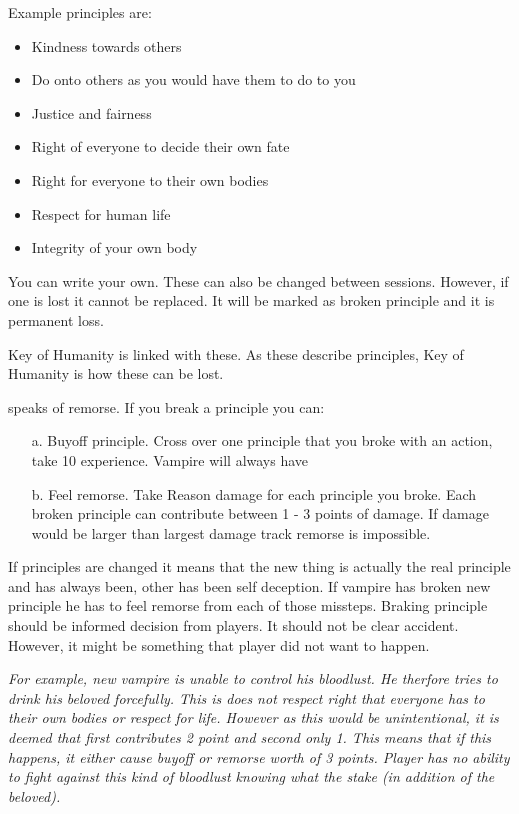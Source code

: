 \documentclass[a4paper, 12pt, finnish]{report}
\begin{document}
Example principles are:
\begin{itemize}
\setlength\itemsep{-2pt}
\item Kindness towards others

\item Do onto others as you would have them to do to you
\item Justice and fairness
\item Right of everyone to decide their own fate
\item Right for everyone to their own bodies
\item Respect for human life
\item Integrity of your own body
\end{itemize}

You can write your own. These can also be changed between sessions. However, if one is lost it cannot be replaced. It will be marked as broken principle and it is permanent loss.

Key of Humanity is linked with these. As these describe principles, Key of Humanity is how these can be lost.

\KeyHumanity{}

\KeyNameHumanity{} speaks of remorse. If you break a principle you can:
\begin{itemize}
\item[a.] Buyoff principle. Cross over one principle that you broke with an action, take 10 experience. Vampire will always have \KeyNameHumanity{}
\item[b.] Feel remorse. Take Reason damage for each principle you broke. Each broken principle can contribute between 1 - 3 points of damage. If damage would be larger than largest damage track remorse is impossible.
\end{itemize}

If principles are changed it means that the new thing is actually the real principle and has always been, other has been self deception.
If vampire has broken new principle he has to feel remorse from each of those missteps.
Braking principle should be informed decision from players.
It should not be clear accident.
However, it might be something that player did not want to happen.

\textit{For example, new vampire is unable to control his bloodlust. He therfore tries to drink his beloved forcefully. This is does not respect right that everyone has to their own bodies or respect for life. However as this would be unintentional, it is deemed that first contributes 2 point and second only 1. This means that if this happens, it either cause buyoff or remorse worth of 3 points.
Player has no ability to fight against this kind of bloodlust knowing what the stake (in addition of the beloved).}
\end{document}
